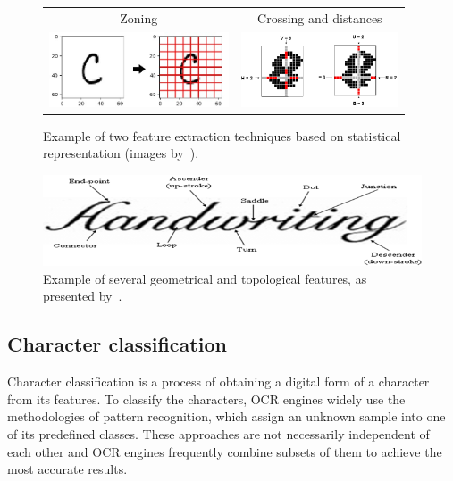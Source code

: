 \begin{figure}[t]
\centering
{\sffamily
\begin{tabular}{cc}
Zoning & Crossing and distances\\
\includegraphics[height=6em]{img/textDetection/feature_zoning.jpg}
&
\includegraphics[height=6em]{img/textDetection/feature_crossing.png}
\end{tabular}
}
\caption{Example of two feature extraction techniques based on statistical representation (images by~\citet{statisticalFeatures}).}
\label{fig:featureExtractionStatistical}
\end{figure}

\begin{figure}[t]
\centering
\includegraphics[width=0.8\linewidth]{img/textDetection/features_geometrical.png}
\caption{Example of several geometrical and topological features, as presented by~\citet{geometricalFeatures}.}
\label{fig:featureExtractionGeometrical}
\end{figure}

\subsection{Character classification}

Character classification is a process of obtaining a digital form of a character from its features. To classify the characters, OCR engines widely use the methodologies of pattern recognition, which assign an unknown sample into one of its predefined classes. These approaches are not necessarily independent of each other and OCR engines frequently combine subsets of them to achieve the most accurate results.

